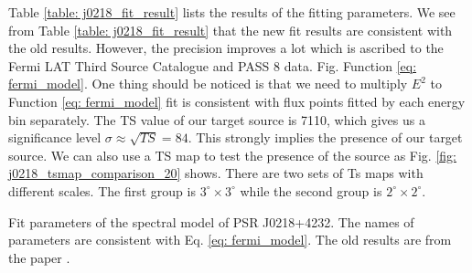 \documentclass[12pt]{report}
\newcommand{\mycaption}[1]{\protect \caption{#1}}
\begin{document}
            Table \ref{table: j0218_fit_result} lists the results of the fitting parameters. 
            We see from Table \ref{table: j0218_fit_result} that the new fit results are consistent 
            with the old results. However, the precision improves a lot which is ascribed to the 
            Fermi LAT Third Source Catalogue and PASS 8 data. Fig.
            Function \ref{eq: fermi_model}.
            One thing should be noticed is that we need to multiply $E^2$ to Function \ref{eq: fermi_model} 
            fit is consistent with flux points fitted by each energy bin separately. 
            The TS value of our target source is 7110, which gives us 
            a significance level $\sigma \approx \sqrt{TS} = 84$. This strongly implies the presence of our
            target source. We can also use a TS map to test the presence of the source as Fig.
            \ref{fig: j0218_tsmap_comparison_20} shows. 
            There are two sets of Ts maps with different scales. The first group is $3^{\circ} 
            \times3^{\circ}$ while the second group is $2^{\circ} \times2^{\circ}$. 
            \vspace{1cm}
            \begin{table}[!ht]
              \centering
                \mycaption{Fit parameters of the spectral model of PSR J0218+4232. 
                  The names of parameters are consistent with Eq.
                  \ref{eq: fermi_model}. The old results are from the paper \cite{0067-0049-208-2-17}.}
                \label{table: j0218_fit_result}        
            \end{table}  
\end{document}
